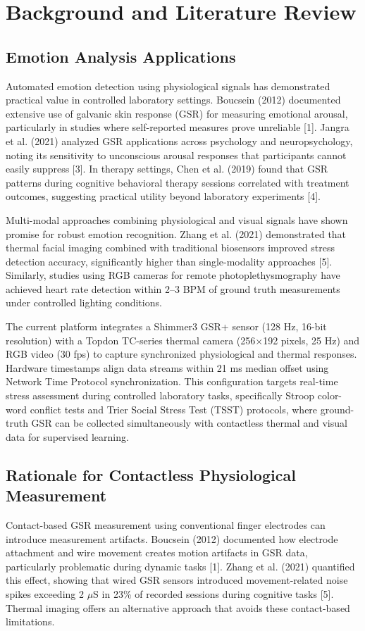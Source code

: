 \chapter{Background and Literature Review}

\section{Emotion Analysis Applications}
Automated emotion detection using physiological signals has demonstrated practical value in controlled laboratory settings. Boucsein (2012) documented extensive use of galvanic skin response (GSR) for measuring emotional arousal, particularly in studies where self-reported measures prove unreliable [1]. Jangra et al. (2021) analyzed GSR applications across psychology and neuropsychology, noting its sensitivity to unconscious arousal responses that participants cannot easily suppress [3]. In therapy settings, Chen et al. (2019) found that GSR patterns during cognitive behavioral therapy sessions correlated with treatment outcomes, suggesting practical utility beyond laboratory experiments [4].

Multi-modal approaches combining physiological and visual signals have shown promise for robust emotion recognition. Zhang et al. (2021) demonstrated that thermal facial imaging combined with traditional biosensors improved stress detection accuracy, significantly higher than single-modality approaches [5]. Similarly, studies using RGB cameras for remote photoplethysmography have achieved heart rate detection within 2--3 BPM of ground truth measurements under controlled lighting conditions.

The current platform integrates a Shimmer3 GSR+ sensor (128 Hz, 16-bit resolution) with a Topdon TC-series thermal camera (256$\times$192 pixels, 25 Hz) and RGB video (30 fps) to capture synchronized physiological and thermal responses. Hardware timestamps align data streams within 21 ms median offset using Network Time Protocol synchronization. This configuration targets real-time stress assessment during controlled laboratory tasks, specifically Stroop color-word conflict tests and Trier Social Stress Test (TSST) protocols, where ground-truth GSR can be collected simultaneously with contactless thermal and visual data for supervised learning.

\section{Rationale for Contactless Physiological Measurement}
Contact-based GSR measurement using conventional finger electrodes can introduce measurement artifacts. Boucsein (2012) documented how electrode attachment and wire movement creates motion artifacts in GSR data, particularly problematic during dynamic tasks [1]. Zhang et al. (2021) quantified this effect, showing that wired GSR sensors introduced movement-related noise spikes exceeding 2 $\mu$S in 23\% of recorded sessions during cognitive tasks [5]. Thermal imaging offers an alternative approach that avoids these contact-based limitations.

